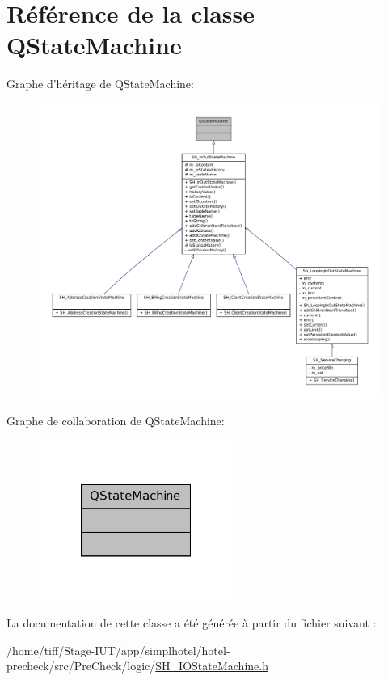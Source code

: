 \hypertarget{classQStateMachine}{\section{Référence de la classe Q\-State\-Machine}
\label{classQStateMachine}
}


Graphe d'héritage de Q\-State\-Machine\-:\nopagebreak
\begin{figure}[H]
\begin{center}
\leavevmode
\includegraphics[width=350pt]{classQStateMachine__inherit__graph}
\end{center}
\end{figure}


Graphe de collaboration de Q\-State\-Machine\-:\nopagebreak
\begin{figure}[H]
\begin{center}
\leavevmode
\includegraphics[width=180pt]{classQStateMachine__coll__graph}
\end{center}
\end{figure}


La documentation de cette classe a été générée à partir du fichier suivant \-:\begin{DoxyCompactItemize}
\item 
/home/tiff/\-Stage-\/\-I\-U\-T/app/simplhotel/hotel-\/precheck/src/\-Pre\-Check/logic/\hyperlink{SH__IOStateMachine_8h}{S\-H\-\_\-\-I\-O\-State\-Machine.\-h}\end{DoxyCompactItemize}
